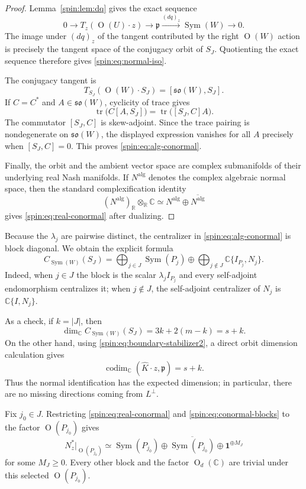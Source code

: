 \documentclass[11pt,reqno]{amsart}
\numberwithin{equation}{section}
\theoremstyle{definition}
\theoremstyle{remark}
\newcommand{\C}{\mathbb C}
\newcommand{\R}{\mathbb R}
\newcommand{\Or}{\operatorname{O}}
\newcommand{\Sym}{\operatorname{Sym}}
\newcommand{\tr}{\operatorname{tr}}
\newcommand{\fp}{\mathfrak p}
\begin{document}
\begin{proof}
Lemma~\ref{spin:lem:dq} gives the exact sequence
\[
  0\longrightarrow T_z(\Or(U)\cdot z)
  \longrightarrow\fp
  \xrightarrow{(dq)_z}\Sym(W)
  \longrightarrow0.
\]
The image under $(dq)_z$ of the tangent contributed by the right $\Or(W)$
action is precisely the tangent space of the conjugacy orbit of $S_J$.
Quotienting the exact sequence therefore gives \eqref{spin:eq:normal-iso}.

The conjugacy tangent is
\[
  T_{S_J}(\Or(W)\cdot S_J)
  =[\mathfrak{so}(W),S_J].
\]
If $C=C^*$ and $A\in\mathfrak{so}(W)$, cyclicity of trace gives
\[
  \tr\bigl(C[A,S_J]\bigr)
  =\tr\bigl([S_J,C]A\bigr).
\]
The commutator $[S_J,C]$ is skew-adjoint.  Since the trace pairing is
nondegenerate on $\mathfrak{so}(W)$, the displayed expression vanishes for all
$A$ precisely when $[S_J,C]=0$.  This proves \eqref{spin:eq:alg-conormal}.

Finally, the orbit and the ambient vector space are complex submanifolds of
their underlying real Nash manifolds.  If $N^{\mathrm{alg}}$ denotes the
complex algebraic normal space, then the standard complexification identity
\[
  (N^{\mathrm{alg}})_{\R}\otimes_{\R}\C
  \simeq
  N^{\mathrm{alg}}\oplus\overline{N^{\mathrm{alg}}}
\]
gives \eqref{spin:eq:real-conormal} after dualizing.
\end{proof}

Because the $\lambda_j$ are pairwise distinct, the centralizer in
\eqref{spin:eq:alg-conormal} is block diagonal.  We obtain the explicit formula
\begin{equation}\label{spin:eq:conormal-blocks}
  C_{\Sym(W)}(S_J)
  =
  \bigoplus_{j\in J}\Sym(P_j)
  \oplus
  \bigoplus_{j\notin J}\C\{I_{P_j},N_j\}.
\end{equation}
Indeed, when $j\in J$ the block is the scalar $\lambda_jI_{P_j}$ and every
self-adjoint endomorphism centralizes it; when $j\notin J$, the self-adjoint
centralizer of $N_j$ is $\C\{I,N_j\}$.

As a check, if $k=|J|$, then
\[
  \dim_\C C_{\Sym(W)}(S_J)
  =3k+2(m-k)=s+k.
\]
On the other hand, using \eqref{spin:eq:boundary-stabilizer2}, a direct orbit
dimension calculation gives
\[
  \operatorname{codim}_\C(\widehat K\cdot z,\fp)=s+k.
\]
Thus the normal identification has the expected dimension; in particular,
there are no missing directions coming from $L^\perp$.

Fix $j_0\in J$.  Restricting \eqref{spin:eq:real-conormal} and
\eqref{spin:eq:conormal-blocks} to the factor $\Or(P_{j_0})$ gives
\begin{equation}\label{spin:eq:factor-conormal}
  N_z^*|_{\Or(P_{j_0})}
  \simeq
  \Sym(P_{j_0})
  \oplus\overline{\Sym(P_{j_0})}
  \oplus\mathbf1^{\oplus M_J}
\end{equation}
for some $M_J\ge0$.  Every other block and the factor $\Or_d(\C)$ are trivial
under this selected $\Or(P_{j_0})$.
\end{document}
